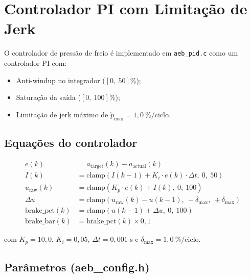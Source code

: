 \documentclass[12pt,a4paper]{article}
\begin{document}
\section{Controlador PI com Limitação de Jerk}
\label{sec:pid}

O controlador de pressão de freio é implementado em \texttt{aeb\_pid.c}
como um controlador PI com:
\begin{itemize}[noitemsep]
    \item Anti-windup no integrador ($[0,\ 50]\%$);
    \item Saturação da saída ($[0,\ 100]\%$);
    \item Limitação de jerk máximo de $\dot{p}_{\max} = 1{,}0\ \%/\text{ciclo}$.
\end{itemize}

\subsection{Equações do controlador}

\begin{align}
    e(k) &= a_{\text{target}}(k) - a_{\text{actual}}(k) \label{eq:err}\\
    I(k) &= \text{clamp}\!\left(I(k-1) + K_i \cdot e(k) \cdot \Delta t,\ 0,\ 50\right) \label{eq:integ}\\
    u_{\text{raw}}(k) &= \text{clamp}\!\left(K_p \cdot e(k) + I(k),\ 0,\ 100\right) \label{eq:raw}\\
    \Delta u &= \text{clamp}\!\left(u_{\text{raw}}(k) - u(k-1),\ -\delta_{\max},\ +\delta_{\max}\right) \label{eq:delta}\\
    \text{brake\_pct}(k) &= \text{clamp}\!\left(u(k-1) + \Delta u,\ 0,\ 100\right) \label{eq:bpct}\\
    \text{brake\_bar}(k) &= \text{brake\_pct}(k) \times 0{,}1 \label{eq:bbar}
\end{align}

com $K_p = 10{,}0$, $K_i = 0{,}05$, $\Delta t = 0{,}001$ s e
$\delta_{\max} = 1{,}0\ \%/\text{ciclo}$.

\subsection{Parâmetros (aeb\_config.h)}
\end{document}
